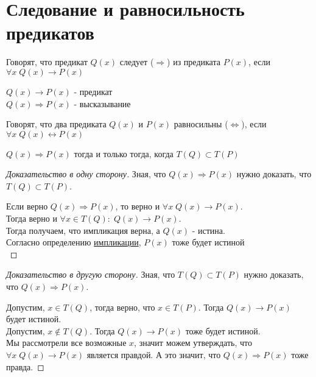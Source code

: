 \section{Следование и равносильность предикатов}

\begin{definition}
    Говорят, что предикат $Q(x)$ следует ($\Rightarrow$) из предиката $P(x)$, если $\forall x \; Q(x) \rightarrow P(x)$
\end{definition}

\begin{remark}
    \hfill

    $Q(x) \rightarrow P(x)$ - предикат \\
    $Q(x) \Rightarrow P(x)$ - высказывание
\end{remark}

\begin{definition}
    Говорят, что два предиката $Q(x)$ и $P(x)$ равносильны ($\Leftrightarrow$), если $\forall x \; Q(x) \leftrightarrow P(x)$
\end{definition}

\begin{theorem}
    \hfill

    \begin{center}
        $Q(x) \Rightarrow P(x)$ тогда и только тогда, когда $T(Q) \subset T(P)$
    \end{center}
\end{theorem}

\begin{proof}[Доказательство в одну сторону]
    Зная, что $Q(x) \Rightarrow P(x)$ нужно доказать, что $T(Q) \subset T(P)$. 

    Если верно $Q(x) \Rightarrow P(x)$, то верно и $\forall x \; Q(x) \rightarrow P(x)$.\\
    Тогда верно и  $\forall x \in T(Q): \; Q(x) \rightarrow P(x)$. \\
    Тогда получаем, что импликация верна, а $Q(x)$ - истина. \\
    Согласно определению \hyperref[def:Импликация]{импликации}, $P(x)$ тоже будет истиной \\
\end{proof}

\begin{proof}[Доказательство в другую сторону]
    Зная, что $T(Q) \subset T(P)$ нужно доказать, что $Q(x) \Rightarrow P(x)$. 

    Допустим, $x \in T(Q)$, тогда верно, что $x \in T(P)$. Тогда $Q(x) \rightarrow P(x)$ будет истиной. \\
    Допустим, $x \notin T(Q)$. Тогда $Q(x) \rightarrow P(x)$ тоже будет истиной. \\ 
    Мы рассмотрели все возможные $x$, значит можем утверждать, что $\forall x \; Q(x) \rightarrow P(x)$ является правдой.
    А это значит, что $Q(x) \Rightarrow P(x)$ тоже правда.
\end{proof}


